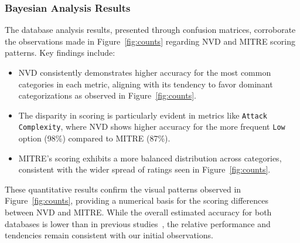 \documentclass[12pt]{article}
\begin{document}
\subsubsection{Bayesian Analysis Results}

The database analysis results, presented through confusion matrices, corroborate the observations
made in Figure~\ref{fig:counts} regarding NVD and MITRE scoring patterns. Key findings include:

\begin{itemize}
	\item NVD consistently demonstrates higher accuracy for the most common categories in each metric,
	      aligning with its tendency to favor dominant categorizations as observed in Figure~\ref{fig:counts}.

	\item The disparity in scoring is particularly evident in metrics like \texttt{Attack Complexity}, where
	      NVD shows higher accuracy for the more frequent \texttt{Low} option (98\%) compared to
	      MITRE (87\%).

	\item MITRE's scoring exhibits a more balanced distribution across categories, consistent with the wider
	      spread of ratings seen in Figure~\ref{fig:counts}.
\end{itemize}

These quantitative results confirm the visual patterns observed in Figure~\ref{fig:counts},
providing a numerical basis for the scoring differences between NVD and MITRE. While the overall
estimated accuracy for both databases is lower than in previous studies~\cite{bayes}, the relative
performance and tendencies remain consistent with our initial observations.

\bigskip
\end{document}
